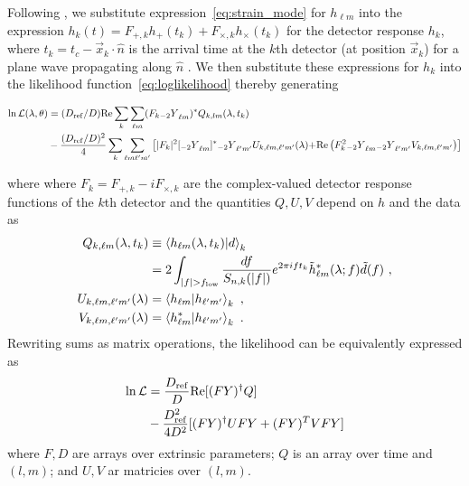 \documentclass[twocolumn,prd,nofootinbib]{revtex4}
\newcommand\qmstateproduct[2]{\left\langle#1|#2\right\rangle}
\newcommand\Y[1]{{{}_{#1}Y}}
\begin{document}
Following \citet{gwastro-PE-AlternativeArchitectures}, we substitute expression~\eqref{eq:strain_mode} 
for $h_{\ell m}$ into the expression $h_k(t) =F_{+,k} h_+(t_k) +
  F_{\times,k}h_\times(t_k)$ for the detector response $h_k$, 
where $t_k=t_c - \vec{x}_k \cdot \hat{n}$ is the arrival time at the $k$th detector (at position $\vec{x}_k$)
for a plane wave propagating along $\hat{n}$ \cite{gwastro-PE-AlternativeArchitectures}.
We then substitute these expressions for $h_k$ into the likelihood function~\eqref{eq:loglikelihood}
thereby generating~\cite{gwastro-PE-AlternativeArchitectures}
\begin{widetext}
\begin{align}
\ln {\cal L}(\lambda, \theta) 
&= (D_{\rm ref}/D) \text{Re} \sum_k \sum_{\ell m}(F_k \Y{-2}_{\ell m})^* Q_{k,lm}(\lambda,t_k)\nonumber \\
&   -\frac{(D_{\rm ref}/D)^2}{4}\sum_k \sum_{\ell m \ell' m'}
\left[
{
|F_k|^2 [\Y{-2}_{\ell m}]^*\Y{-2}_{\ell'm'} U_{k,\ell m,\ell' m'}(\lambda)
}
 {
+  \text{Re} \left( F_k^2 \Y{-2}_{\ell m} \Y{-2}_{\ell'm'} V_{k,\ell m,\ell'm'} \right)
}
\right]
\label{eq:def:lnL:Decomposed}
\end{align}
\end{widetext}
where 
 where $F_k = F_{+,k} - i F_{\times,k}$ are the
complex-valued detector
response functions of the $k$th detector \cite{gwastro-PE-AlternativeArchitectures} and 
the quantities $Q,U,V$ depend on $h$ and the data as
\begin{subequations}
\label{eq:QUV}
\begin{align}
Q_{k,\ell m}(\lambda,t_k) &\equiv \qmstateproduct{h_{\ell m}(\lambda,t_k)}{d}_k \nonumber\\
&= 2 \int_{|f|>f_{\rm low}} \frac{df}{S_{n,k}(|f|)} e^{2\pi i f t_k} \tilde{h}_{\ell m}^*(\lambda;f) \tilde{d}(f)\ , \\
{ U_{k,\ell m,\ell' m'}(\lambda)}& = \qmstateproduct{h_{\ell m}}{h_{\ell'm'}}_k\ , \\
V_{k,\ell m,\ell' m'}(\lambda)& = \qmstateproduct{h_{\ell m}^*}{h_{\ell'm'}}_k  \ .
\end{align}
\end{subequations}
Rewriting sums as matrix operations, the likelihood can be equivalently expressed as
\begin{align}
\ln {\cal L} &= \frac{D_{\rm ref}}{D} \text{Re}[ (F Y)^\dag Q]  \nonumber \\
 & - \frac{D_{\rm ref}^2}{4 D^2} [ (FY)^\dag U FY + (FY)^TV FY]
\label{eq:lnL:MatrixForm}
\end{align}
where $F,D$ are arrays over extrinsic parameters; $Q$ is an array over time and $(l,m)$; and $U,V$ ar matricies over
$(l,m)$. 
\end{document}
